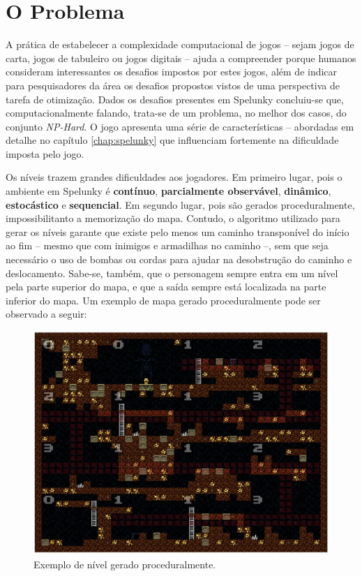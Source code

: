 \chapter{\label{chap:problem}O Problema}
A prática de estabelecer a complexidade computacional de jogos -- sejam jogos de
carta, jogos de tabuleiro ou jogos digitais -- ajuda a compreender  porque
humanos consideram interessantes os desafios impostos por estes jogos, além de
indicar para pesquisadores da área os desafios propostos vistos de uma
perspectiva de tarefa de otimização.  Dados os desafios presentes em Spelunky
concluiu-se que, computacionalmente falando, trata-se de um problema, no melhor
dos casos, do conjunto \textit{NP-Hard}\cite{SPELUNKYHARD}. O jogo apresenta uma
série de características -- abordadas em detalhe no capítulo \ref{chap:spelunky}
que influenciam fortemente na dificuldade imposta pelo jogo.

Os níveis trazem grandes dificuldades aos jogadores. Em primeiro lugar, pois o
ambiente em Spelunky é \textbf{contínuo}, \textbf{parcialmente observável},
\textbf{dinâmico}, \textbf{estocástico} e \textbf{sequencial}. Em segundo
lugar, pois são gerados proceduralmente, impossibilitanto a memorização do
mapa.  Contudo, o algoritmo utilizado para gerar os níveis garante que existe
pelo menos um caminho transponível do início ao fim -- mesmo que com inimigos e
armadilhas no caminho --, sem que seja necessário o uso de bombas ou cordas
para ajudar na desobstrução do caminho e deslocamento. Sabe-se, também, que o
personagem sempre entra em um nível pela parte superior do mapa, e que a saída
sempre está localizada na parte inferior do mapa. Um exemplo de mapa gerado
proceduralmente pode ser observado a seguir:

\begin{figure}[htb!]
\centering\includegraphics[width=.65\textwidth]{fig/spelunky-level-example.png}
\caption {\label{fig:spelunky-level-example}Exemplo de nível gerado
proceduralmente.} \end{figure}

